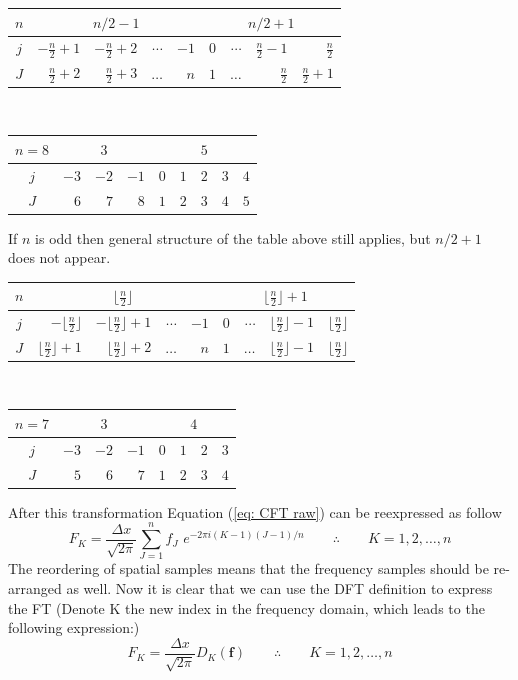 \begin{center}
\begin{tabular}{c|rrrrrrrr}
$n$ & \multicolumn{4}{c|}{$n/2-1$} & \multicolumn{4}{c}{$n/2+1$}
\\\hline
$j$ & $-\frac{n}{2}+1$ & $-\frac{n}{2}+2$ & $\cdots$ & $-1$ &
$0$ & $\cdots$ & $\frac{n}{2}-1$ & $\frac{n}{2}$
\\
$J$ & $\frac{n}{2}+2$ & $\frac{n}{2}+3$ & $\ldots$ & $n$ &
$1$ & $\ldots$ & $\frac{n}{2}$ & 
$\frac{n}{2}+1$
\\\hline
\end{tabular}
\\[5mm]
\begin{tabular}{c|rrrrrrrr}
$n=8$& \multicolumn{3}{c|}{$3$} & \multicolumn{5}{c}{$5$}
\\\hline
$j$ & $-3$ & $-2$ & $-1$ & $0$ & $1$ & $2$ & $3$ & $4$
\\
$J$ & $6$ & $7$ & $8$ & $1$ & $2$ & $3$ & $4$ & $5$
\\\hline
\end{tabular}
\end{center}
If $n$ is odd then general structure of the table above still applies, but $n/2+1$ does not appear. 
\begin{center}
\begin{tabular}{c|rrrrrrrr}
$n$ & \multicolumn{4}{c|}{$\lfloor\frac{n}{2}\rfloor$} & \multicolumn{4}{c}{$\lfloor\frac{n}{2}\rfloor+1$}
\\\hline
$j$ & $-\lfloor\frac{n}{2}\rfloor$ & $-\lfloor\frac{n}{2}\rfloor+1$ & $\cdots$ & $-1$ &
$0$ & $\cdots$ & $\lfloor\frac{n}{2}\rfloor-1$ & 
$\lfloor\frac{n}{2}\rfloor$
\\
$J$ & $\lfloor\frac{n}{2}\rfloor+1$ & $\lfloor\frac{n}{2}\rfloor+2$ & $\ldots$ & $n$ &
$1$ & $\ldots$ & $\lfloor\frac{n}{2}\rfloor-1$ & 
$\lfloor\frac{n}{2}\rfloor$
\\\hline
\end{tabular}
\\[5mm]
\begin{tabular}{c|rrrrrrr}
$n=7$& \multicolumn{3}{c|}{$3$} & \multicolumn{4}{c}{$4$}
\\\hline
$j$ & $-3$ & $-2$ & $-1$ & $0$ & $1$ & $2$ & $3$
\\
$J$ & $5$ & $6$ & $7$ & $1$ & $2$ & $3$ & $4$
\\\hline
\end{tabular}
\end{center}
After this transformation Equation (\ref{eq: CFT raw}) can be reexpressed as follow
\begin{equation}
F_K = \frac{\Delta x}{\sqrt{2\pi}}\sum_{J=1}^{n} f_J\,\, e^{-2\pi i (K-1)(J-1)/n}
\qquad\therefore\qquad
K=1,2,\ldots,n
\label{eq: CFT end}
\end{equation}
The reordering of spatial samples means that the frequency samples should be re-arranged as well. 
Now it is clear that we can use the DFT definition to express the FT
(Denote K the new index in the frequency domain, which leads to the following expression:)
\begin{equation}
F_K = \frac{\Delta x}{\sqrt{2\pi}}D_K( \boldsymbol{f} )
\qquad\therefore\qquad
K=1,2,\ldots,n
\end{equation}



